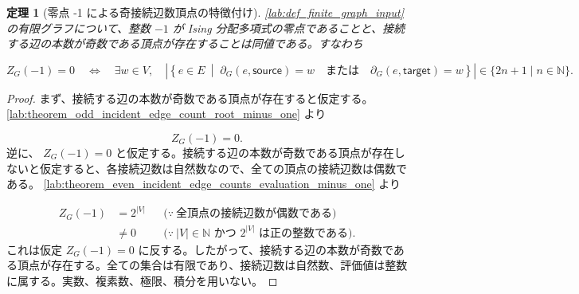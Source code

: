 \documentclass[11pt,a4paper]{article}
\newtheorem{theorem}[definition]{定理}
\theoremstyle{remark}
\begin{document}
\begin{theorem}[零点 -1 による奇接続辺数頂点の特徴付け]\label{lab:theorem_root_minus_one_characterizes_odd_incident_edge_count}
\cref{lab:def_finite_graph_input}
 の有限グラフについて、整数 
$-1$
 が Ising 分配多項式の零点であることと、接続する辺の本数が奇数である頂点が存在することは同値である。すなわち

\[Z_G(-1)=0
\quad\Longleftrightarrow\quad
\exists w\in V,\quad
\left|
  \left\{
    e\in E
    \ \middle|\;
    \partial_G(e,\mathsf{source})=w
    \quad\text{または}\quad
    \partial_G(e,\mathsf{target})=w
  \right\}
\right|
\in\{2n+1\mid n\in\mathbb N\}.\]
\end{theorem}
\begin{proof}
まず、接続する辺の本数が奇数である頂点が存在すると仮定する。
\cref{lab:theorem_odd_incident_edge_count_root_minus_one}
 より

\[Z_G(-1)=0.\]
逆に、
$Z_G(-1)=0$
 と仮定する。接続する辺の本数が奇数である頂点が存在しないと仮定すると、各接続辺数は自然数なので、全ての頂点の接続辺数は偶数である。
\cref{lab:theorem_even_incident_edge_counts_evaluation_minus_one}
 より

\[\begin{aligned}
Z_G(-1)
&=2^{|V|}
&&\bigl(\because\ \text{全頂点の接続辺数が偶数である}\bigr)\\
&\ne0
&&\bigl(\because\ |V|\in\mathbb N\text{ かつ }2^{|V|}\text{ は正の整数である}\bigr).
\end{aligned}\]
これは仮定 
$Z_G(-1)=0$
 に反する。したがって、接続する辺の本数が奇数である頂点が存在する。全ての集合は有限であり、接続辺数は自然数、評価値は整数に属する。実数、複素数、極限、積分を用いない。

\end{proof}
\end{document}
